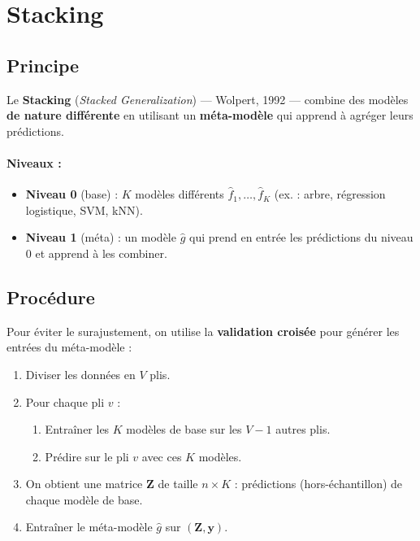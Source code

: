 \documentclass[a4paper,11pt]{article}
\begin{document}
\newpage

\section{Stacking}

\subsection{Principe}

Le \textbf{Stacking} (\textit{Stacked Generalization}) — Wolpert, 1992 — combine des modèles \textbf{de nature différente} en utilisant un \textbf{méta-modèle} qui apprend à agréger leurs prédictions.

\paragraph{Niveaux :}
\begin{itemize}
    \item \textbf{Niveau 0} (base) : $K$ modèles différents $\hat{f}_1, \ldots, \hat{f}_K$ (ex. : arbre, régression logistique, SVM, kNN).
    \item \textbf{Niveau 1} (méta) : un modèle $\hat{g}$ qui prend en entrée les prédictions du niveau 0 et apprend à les combiner.
\end{itemize}

\subsection{Procédure}

Pour éviter le surajustement, on utilise la \textbf{validation croisée} pour générer les entrées du méta-modèle :

\begin{enumerate}
    \item Diviser les données en $V$ plis.
    \item Pour chaque pli $v$ :
    \begin{enumerate}
        \item Entraîner les $K$ modèles de base sur les $V-1$ autres plis.
        \item Prédire sur le pli $v$ avec ces $K$ modèles.
    \end{enumerate}
    \item On obtient une matrice $\mathbf{Z}$ de taille $n \times K$ : prédictions (hors-échantillon) de chaque modèle de base.
    \item Entraîner le méta-modèle $\hat{g}$ sur $(\mathbf{Z}, \mathbf{y})$.
\end{enumerate}
\end{document}

